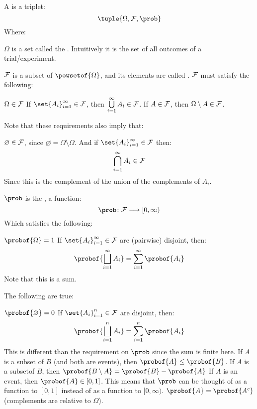 \begin{defn*}

	A  is a triplet:
	\[ \tuple{\Omega, \cF, \prob} \]
	Where:
	\begin{msecitemize}
		\mitem $\Omega$ is a set called the .
		Intuitively it is the set of all outcomes of a trial/experiment.

		\mitem ${\cal F}$ is a subset of $\powsetof{\Omega}$, and its elements are called .
		${\cal F}$ must satisfy the following:
		\begin{msecitemize}
			\mitem $\Omega\in{\cal F}$
			\mitem If $\set{A_i}_{i=1}^\infty\in\cF$, then $\bigcup\limits_{i=1}^\infty A_i\in{\cal F}$.
			\mitem If $A\in{\cal F}$, then $\Omega\setminus A\in {\cal F}$.
		\end{msecitemize}

		\begin{note}
			Note that these requirements also imply that:
			\begin{msecitemize}
				\mitem $\varnothing\in{\cal F}$, since $\varnothing=\Omega\setminus\Omega$.
				\mitem And if $\set{A_i}_{i=1}^\infty\in\cF$ then:
					\[ \bigcap_{i=1}^\infty A_i\in{\cal F} \]
				Since this is the complement of the union of the complements of $A_i$.
			\end{msecitemize}
		\end{note}

		\mitem $\prob$ is the , a function:
			\[ \prob\colon\cF\longrightarrow[0,\infty) \]
		Which satisfies the following:
			\begin{msecitemize}
				\mitem $\probof{\Omega}=1$
					\mitem If $\set{A_i}_{i=1}^\infty\in\cF$ are (pairwise) disjoint, then:
					\[ \probof{\bigsqcup_{i=1}^\infty A_i} = \sum_{i=1}^\infty\probof{A_i} \]
				Note that this is a \ppemph{countably infinite} sum.
			\end{msecitemize}
	\end{msecitemize}

\end{defn*}

\begin{prop*}

	The following are true:
	\begin{msecenumerate}
		\mitem $\probof{\varnothing}=0$
		\mitem If $\set{A_i}_{i=1}^n\in\cF$ are disjoint, then:
			\[ \probof{\bigsqcup_{i=1}^n A_i} = \sum_{i=1}^n\probof{A_i} \]
		This is different than the requirement on $\prob$ since the sum is finite here.
		\mitem If $A$ is a subset of $B$ (and both are events), then $\probof{A}\leq\probof{B}$.
		\mitem If $A$ is a subsetof $B$, then $\probof{B\setminus A} = \probof{B} - \probof{A}$
		\mitem If $A$ is an event, then $\probof{A}\in[0,1]$.
		This means that $\prob$ can be thought of as a function to $[0,1]$ instead of as a function to $[0,\infty)$.
		\mitem $\probof{A}=\probof{A^c}$ (complements are relative to $\Omega$).
	\end{msecenumerate}

\end{prop*}

